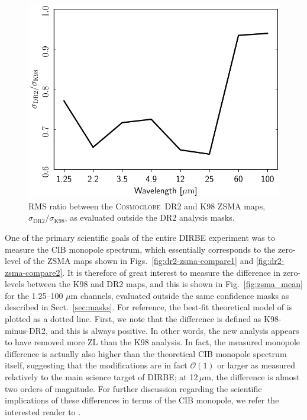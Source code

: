 \documentclass[twocolumn]{aa}
\newcommand{\cosmoglobe}{\textsc{Cosmoglobe}}
\begin{document}
\begin{figure}
    \centering
    \includegraphics[width=\linewidth]{figs/zodi_rms_ratio_DIRBE_DR2_v2.pdf}
    \caption{RMS ratio between the \cosmoglobe\ DR2 and K98 ZSMA maps,
      $\sigma_{\mathrm{DR2}}/\sigma_\mathrm{K98}$, as evaluated
      outside the DR2 analysis masks.}
    \label{fig:zsma_rms}
\end{figure}


One of the primary scientific goals of the entire DIRBE experiment was
to measure the CIB monopole spectrum, which essentially corresponds to
the zero-level of the ZSMA maps shown in
Figs.~\ref{fig:dr2-zsma-compare1} and \ref{fig:dr2-zsma-compare2}. It
is therefore of great interest to measure the difference in
zero-levels between the K98 and DR2 maps, and this is shown in
Fig.~\ref{fig:zsma_mean} for the 1.25--100 $\mu$m channels, evaluated
outside the same confidence masks as described in
Sect.~\ref{sec:masks}. For reference, the best-fit theoretical model
of \citet{finke2022} is plotted as a dotted line. First, we note that
the difference is defined as K98-minus-DR2, and this is always
positive. In other words, the new analysis appears to have removed
more ZL than the K98 analysis. In fact, the measured monopole
difference is actually also higher than the theoretical CIB monopole
spectrum itself, suggesting that the modifications are in fact
$\mathcal{O}(1)$ or larger as measured relatively to the main science
target of DIRBE; at 12$\,\mu$m, the difference is almost two orders of
magnitude. For further discussion regarding the scientific
implications of these differences in terms of the CIB monopole, we
refer the interested reader to \citet{CG02_03}.
\end{document}
